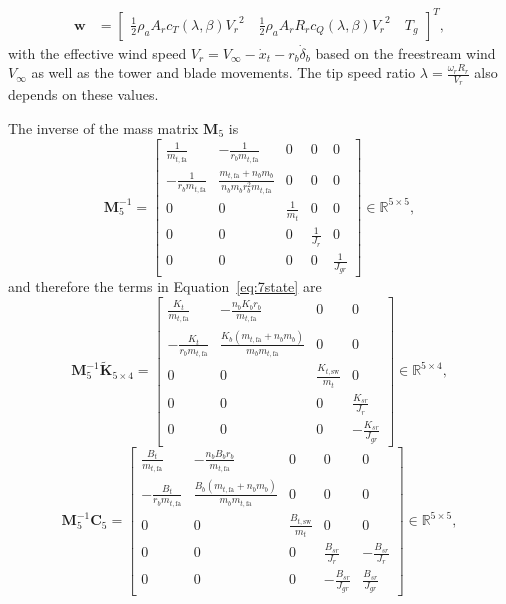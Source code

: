     \begin{align*}
        \bm{w} & =\begin{bmatrix}
            \frac{1}{2}\rho_a A_rc_{T}(\lambda
            ,\beta){V_r}^{2} \quad
            \frac{1}{2}\rho_a A_rR_rc_Q(\lambda,\beta){V_r}^{2} 
            \quad T_g
        \end{bmatrix}^T,  
    \end{align*}
    with the effective wind speed $V_r = V_{\infty} -\dot{x}_t- r_b\dot{\delta}_b$ based on the freestream wind $V_{\infty}$ as well as the tower and blade movements. The tip speed ratio $\lambda= \frac {\omega_{r}R_r}{V_r}$ also depends on these values.
    
    The inverse of the mass matrix $\mathbf{M}_5$ is
    \[
    \mathbf{M}_5^{-1} = \begin{bmatrix}
        \frac{1}{m_{t,\text{fa}}} & -\frac{1} {r_b m_{t,\text{fa}}} & 0 & 0 & 0\\
        -\frac{1}{r_b m_{t,\text{fa}}} & \frac{m_{t,\text{fa}} +n_b m_b}{n_b m_b r^2_b m_{t,\text{fa}}} & 0 & 0 & 0\\
        0 & 0 & \frac{1}{m_t} & 0 &0\\
        0 & 0 & 0 & \frac{1}{J_r} & 0\\
        0 & 0 & 0 & 0 & \frac{1}{J_{gr}}
    \end{bmatrix} \in \mathbb{R}^{5 \times 5},
    \]
    and therefore the terms in Equation~\eqref{eq:7state} are 
    \[
    \mathbf{M}_5^{-1}\tilde{\mathbf{K}}_{5 \times 4} =
    \begin{bmatrix}
        \frac{K_t}{m_{t,\text{fa}}} &- \frac{n_b K_b r_b} {m_{t,\text{fa}}} & 0 & 0 \\
        -\frac{K_t}{r_b m_{t,\text{fa}}} & \frac{K_b(m_{t,\text{fa}} + n_b m_b)}{m_b m_{t,\text{fa}}} & 0 & 0 \\
        0 & 0 & \frac{K_{t,\text{sw}}}{m_t} & 0 \\
        0 & 0 & 0 & \frac{K_{sr}}{J_r} \\
        0 & 0 & 0 & -\frac{K_{sr}}{J_{gr}}
    \end{bmatrix} \in \mathbb{R}^{5 \times 4},
    \]
    \[
    \mathbf{M}_5^{-1}\mathbf{C}_{5} = \begin{bmatrix}
        \frac{B_t}{m_{t,\text{fa}}} & - \frac{n_b B_b r_b} {m_{t,\text{fa}}} & 0 & 0 & 0\\
        -\frac{B_t}{r_b m_{t,\text{fa}}} & \frac{B_b(m_{t,\text{fa}} + n_b m_b)}{m_b m_{t,\text{fa}}} & 0 & 0 & 0\\
        0 & 0 & \frac{B_{t,\text{sw}}}{m_t} & 0 &0\\
        0 & 0 & 0 & \frac{B_{sr}}{J_r} & -\frac{B_{sr}}{J_r}\\
        0 & 0 & 0 & -\frac{B_{sr}}{J_{gr}} & \frac{B_{sr}}{J_{gr}}
    \end{bmatrix} \in \mathbb{R}^{5 \times 5},
    \]
